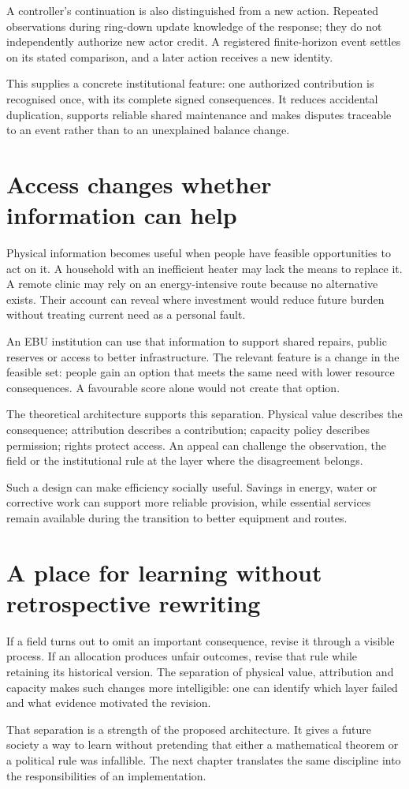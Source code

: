 A controller's continuation is also distinguished from a new action. Repeated observations during ring-down update knowledge of the response; they do not independently authorize new actor credit. A registered finite-horizon event settles on its stated comparison, and a later action receives a new identity.

This supplies a concrete institutional feature: one authorized contribution is recognised once, with its complete signed consequences. It reduces accidental duplication, supports reliable shared maintenance and makes disputes traceable to an event rather than to an unexplained balance change.

\section{Access changes whether information can help}
Physical information becomes useful when people have feasible opportunities to act on it. A household with an inefficient heater may lack the means to replace it. A remote clinic may rely on an energy-intensive route because no alternative exists. Their account can reveal where investment would reduce future burden without treating current need as a personal fault.

An EBU institution can use that information to support shared repairs, public reserves or access to better infrastructure. The relevant feature is a change in the feasible set: people gain an option that meets the same need with lower resource consequences. A favourable score alone would not create that option.

The theoretical architecture supports this separation. Physical value describes the consequence; attribution describes a contribution; capacity policy describes permission; rights protect access. An appeal can challenge the observation, the field or the institutional rule at the layer where the disagreement belongs.

Such a design can make efficiency socially useful. Savings in energy, water or corrective work can support more reliable provision, while essential services remain available during the transition to better equipment and routes.

\section{A place for learning without retrospective rewriting}
If a field turns out to omit an important consequence, revise it through a visible process. If an allocation produces unfair outcomes, revise that rule while retaining its historical version. The separation of physical value, attribution and capacity makes such changes more intelligible: one can identify which layer failed and what evidence motivated the revision.

That separation is a strength of the proposed architecture. It gives a future society a way to learn without pretending that either a mathematical theorem or a political rule was infallible. The next chapter translates the same discipline into the responsibilities of an implementation.
